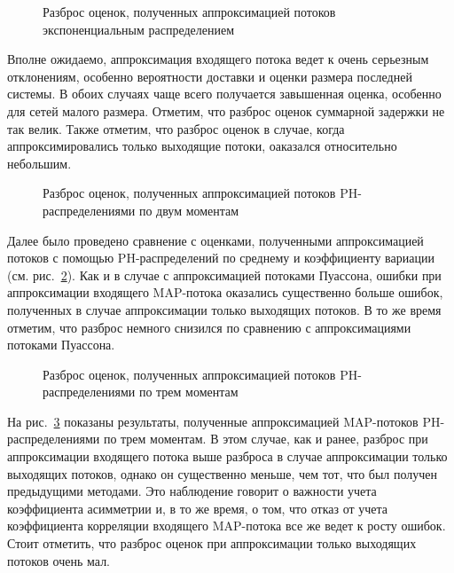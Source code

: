 \begin{figure}[h]
  \caption{Разброс оценок, полученных аппроксимацией потоков экспоненциальным распределением}
  \label{fig:ch4_scatter_ph1}
\end{figure}

Вполне ожидаемо, аппроксимация входящего потока ведет к очень серьезным отклонениям, особенно вероятности доставки и оценки размера последней системы. В обоих случаях чаще всего получается завышенная оценка, особенно для сетей малого размера. Отметим, что разброс оценок суммарной задержки не так велик. Также отметим, что разброс оценок в случае, когда аппроксимировались только выходящие потоки, оаказался относительно небольшим.

\begin{figure}[h]
  \caption{Разброс оценок, полученных аппроксимацией потоков PH-распределениями по двум моментам}
  \label{fig:ch4_scatter_ph2}
\end{figure}

Далее было проведено сравнение с оценками, полученными аппроксимацией потоков с помощью PH-распределений по среднему и коэффициенту вариации (см. рис.~\ref{fig:ch4_scatter_ph2}). Как и в случае с аппроксимацией потоками Пуассона, ошибки при аппроксимации входящего MAP-потока оказались существенно больше ошибок, полученных в случае аппроксимации только выходящих потоков. В то же время отметим, что разброс немного снизился по сравнению с аппроксимациями потоками Пуассона.

\begin{figure}[h]
  \caption{Разброс оценок, полученных аппроксимацией потоков PH-распределениями по трем моментам}
  \label{fig:ch4_scatter_ph3}
\end{figure}

На рис.~\ref{fig:ch4_scatter_ph3} показаны результаты, полученные аппроксимацией MAP-потоков PH-распределениями по трем моментам. В этом случае, как и ранее, разброс при аппроксимации входящего потока выше разброса в случае аппроксимации только выходящих потоков, однако он существенно меньше, чем тот, что был получен предыдущими методами. Это наблюдение говорит о важности учета коэффициента асимметрии и, в то же время, о том, что отказ от учета коэффициента корреляции входящего MAP-потока все же ведет к росту ошибок. Стоит отметить, что разброс оценок при аппроксимации только выходящих потоков очень мал.

